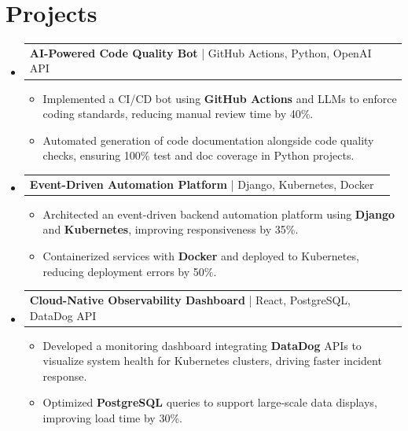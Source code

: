 \documentclass[letterpaper,11pt]{article}
\makeatletter
\newcommand{\resumeItem}[1]{
  \item\footnotesize{
    {#1 \vspace{-2pt}}
  }
}
\newcommand{\resumeProjectHeading}[2]{
    \item
    \begin{tabular*}{1.001\textwidth}{l@{\extracolsep{\fill}}r}
      \small#1 & \textbf{\small #2}\\
    \end{tabular*}\vspace{-7pt}
}
\newcommand{\resumeSubHeadingListStart}{\begin{itemize}[leftmargin=0pt, label={}]}
\newcommand{\resumeSubHeadingListEnd}{\end{itemize}}
\newcommand{\resumeItemListStart}{\begin{itemize}[leftmargin=*]}
\newcommand{\resumeItemListEnd}{\end{itemize}\vspace{-5pt}}
\makeatother
\begin{document}
\section{Projects}
    \vspace{-5pt}
    \resumeSubHeadingListStart
      \resumeProjectHeading
          {\textbf{AI-Powered Code Quality Bot} | GitHub Actions, Python, OpenAI API}{}
          \resumeItemListStart
              \resumeItem{Implemented a CI/CD bot using \textbf{GitHub Actions} and LLMs to enforce coding standards, reducing manual review time by 40\%.}
              \resumeItem{Automated generation of code documentation alongside code quality checks, ensuring 100\% test and doc coverage in Python projects.}
          \resumeItemListEnd
          \vspace{-12pt}
      \resumeProjectHeading
          {\textbf{Event-Driven Automation Platform} | Django, Kubernetes, Docker}{}
          \resumeItemListStart
              \resumeItem{Architected an event-driven backend automation platform using \textbf{Django} and \textbf{Kubernetes}, improving responsiveness by 35\%.}
              \resumeItem{Containerized services with \textbf{Docker} and deployed to Kubernetes, reducing deployment errors by 50\%.}
          \resumeItemListEnd
          \vspace{-12pt}
      \resumeProjectHeading
          {\textbf{Cloud-Native Observability Dashboard} | React, PostgreSQL, DataDog API}{}
          \resumeItemListStart
              \resumeItem{Developed a monitoring dashboard integrating \textbf{DataDog} APIs to visualize system health for Kubernetes clusters, driving faster incident response.}
              \resumeItem{Optimized \textbf{PostgreSQL} queries to support large-scale data displays, improving load time by 30\%.}
          \resumeItemListEnd 
    \resumeSubHeadingListEnd
\end{document}
